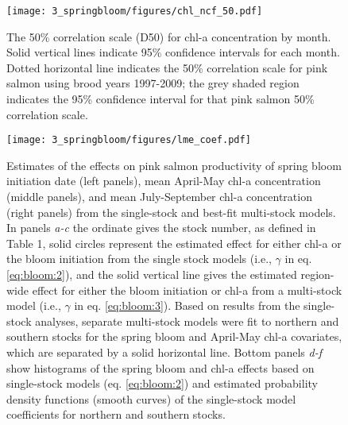 \begin{figure}[htbp]
  \centering \texttt{[image: 3\_springbloom/figures/chl\_ncf\_50.pdf]}
  \caption{The 50\% correlation scale (D50) for chl-a concentration by month.
    Solid vertical lines indicate 95\% confidence intervals for each month.
    Dotted horizontal line indicates the 50\% correlation scale for pink salmon
    using brood years 1997-2009; the grey shaded region indicates the 95\%
    confidence interval for that pink salmon 50\% correlation scale.}
  \label{fig:bloom:5}
\end{figure}

\begin{figure}[htbp]
  \centering \texttt{[image: 3\_springbloom/figures/lme\_coef.pdf]}
  \caption{Estimates of the effects on pink salmon productivity of spring bloom
    initiation date (left panels), mean April-May chl-a concentration (middle
    panels), and mean July-September chl-a concentration (right panels) from the
    single-stock and best-fit multi-stock models. In panels \emph{a-c} the
    ordinate gives the stock number, as defined in Table 1, solid circles
    represent the estimated effect for either chl-a or the bloom initiation from
    the single stock models (i.e., \(\gamma\) in eq. \ref{eq:bloom:2}), and the
    solid vertical line gives the estimated region-wide effect for either the
    bloom initiation or chl-a from a multi-stock model (i.e., \(\gamma\) in eq.
    \ref{eq:bloom:3}). Based on results from the single-stock analyses, separate
    multi-stock models were fit to northern and southern stocks for the spring
    bloom and April-May chl-a covariates, which are separated by a solid
    horizontal line. Bottom panels \emph{d-f} show histograms of the spring
    bloom and chl-a effects based on single-stock models (eq. \ref{eq:bloom:2})
    and estimated probability density functions (smooth curves) of the
    single-stock model coefficients for northern and southern stocks.}
  \label{fig:bloom:6}
\end{figure}

